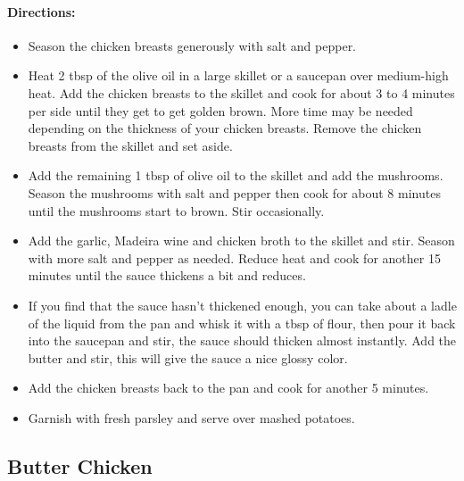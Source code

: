 \documentclass{article}
\begin{document}
\paragraph{Directions:}
\begin{itemize}
	\item Season the chicken breasts generously with salt and pepper.
	\item Heat 2 tbsp of the olive oil in a large skillet or a saucepan over medium-high heat. Add the chicken
	breasts to the skillet and cook for about 3 to 4 minutes per side until they get to get golden brown. More
	time may be needed depending on the thickness of your chicken breasts. Remove the chicken breasts from
	the skillet and set aside.
	\item Add the remaining 1 tbsp of olive oil to the skillet and add the mushrooms. Season the mushrooms with
	salt and pepper then cook for about 8 minutes until the mushrooms start to brown. Stir occasionally.
	\item Add the garlic, Madeira wine and chicken broth to the skillet and stir. Season with more salt and pepper
	as needed. Reduce heat and cook for another 15 minutes until the sauce thickens a bit and reduces.
	\item If you find that the sauce hasn’t thickened enough, you can take about a ladle of the liquid from the pan
	and whisk it with a tbsp of flour, then pour it back into the saucepan and stir, the sauce should thicken
	almost instantly. Add the butter and stir, this will give the sauce a nice glossy color.
	\item Add the chicken breasts back to the pan and cook for another 5 minutes.
	\item Garnish with fresh parsley and serve over mashed potatoes.	
\end{itemize}

\subsection{Butter Chicken}
\end{document}
